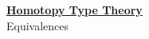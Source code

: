 \documentclass[hott-all.tex]{subfiles}
\begin{document}
\begin{center}
  {\Large{\underline{\textbf{Homotopy Type Theory}}}} \\[2mm]
  {\large Equivalences}
\end{center}
\setcounter{chapter}{4}


%
\end{document}
